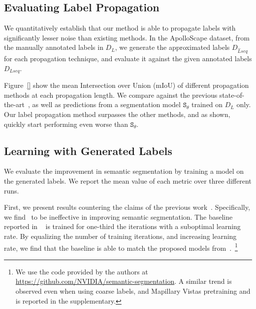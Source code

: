 \subsection{Evaluating Label Propagation}
\label{subsec-lp_eval}
We quantitatively establish that our method is able to propagate labels with significantly lesser noise than existing methods. 
In the ApolloScape dataset, from the manually annotated labels in $D_L$, we generate the approximated labels $D_{\hat{L}seq}$ for each propagation technique, and evaluate it against the given annotated labels $D_{Lseq}$.

Figure~\ref{} show the mean Intersection over Union (mIoU) of different propagation methods at each propagation length. 
We compare against the previous state-of-the-art~\cite{nvidia_cvpr19}, as well as predictions from a segmentation model $\mathtt{S}_\theta$ trained on $D_L$ only. Our label propagation method surpasses the other methods, and as shown, \cite{nvidia_cvpr19} quickly start performing even worse than $\mathtt{S}_\theta$. 


\subsection{Learning with Generated Labels}
\label{subsec-lp_train}

 We evaluate the improvement in semantic segmentation by training a model on the generated labels. We report the mean value of each metric over three different runs.%

First, we present results countering the claims of the previous work~\cite{nvidia_cvpr19}. Specifically, we find~\cite{nvidia_cvpr19} to be ineffective in improving semantic segmentation. The baseline reported in ~\cite{nvidia_cvpr19} is trained for one-third the iterations with a suboptimal learning rate. By equalizing the number of training iterations, and increasing learning rate, we find that the baseline is able to match the proposed models from~\cite{nvidia_cvpr19}.~\footnote{We use the code provided by the authors at \url{https://github.com/NVIDIA/semantic-segmentation}. A similar trend is observed even when using coarse labels, and Mapillary Vistas pretraining and is reported in the supplementary.}


